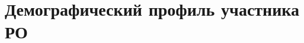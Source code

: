 \documentclass[12pt,openany]{extbook}
\begin{document}
\def\contentsname{Содержание}
\tableofcontents

\chapter{Демографический профиль участника РО}

% 

% 

% 

% 
\end{document}
